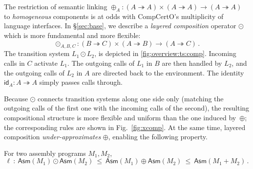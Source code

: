 \documentclass[acmsmall,screen,review,anonymous,nonacm]{acmart}
\newcommand{\kw}[1]{\ensuremath{ \mathsf{#1} }}
\begin{document}
The restriction of semantic linking
$
  {\oplus}_A : (A \twoheadrightarrow A) \times (A \twoheadrightarrow A)
  \rightarrow (A \twoheadrightarrow A)
$
to \emph{homogeneous} components
is at odds with
CompCertO's multiplicity of language interfaces.
In \S\ref{sec:base},
we describe a \emph{layered composition} operator $\odot$
which is more fundamental and more flexible:
\[
  {\odot}_{A,B,C} :
    (B \twoheadrightarrow C) \times
    (A \twoheadrightarrow B) \rightarrow
    (A \twoheadrightarrow C)
  \,.
\]
The transition system $L_1 \odot L_2$,
is depicted in \autoref{fig:overview:ts:comp}.
Incoming calls in $C$ activate $L_1$.
The outgoing calls of $L_1$ in $B$ are then handled by $L_2$, and
the outgoing calls of $L_2$ in $A$
are directed back to the environment.
The identity $\kw{id}_A : A \twoheadrightarrow A$
simply passes calls through.


Because $\odot$ connects transition systems
along one side only
(matching the outgoing calls of the first one with
the incoming calls of the second),
the resulting compositional structure
is more flexible and uniform
than the one induced by~$\oplus$;
the corresponding rules are shown
in Fig.~\ref{fig:xcomp}.
%
At the same time, layered composition
\emph{under-approximates} $\oplus$,
enabling the following property.

\begin{theorem} \label{thm:linking}
For two assembly programs $M_1, M_2$,
\[
  \ell\::\:
  \kw{Asm}(M_1) \odot \kw{Asm}(M_2)
  \:\le\:
  \kw{Asm}(M_1) \oplus \kw{Asm}(M_2)
  \:\le\:
  \kw{Asm}(M_1 + M_2)
 \,.
\]
\end{theorem}

\end{document}
